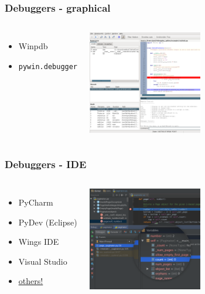 \documentclass[14pt,notes,svgnames,aspectratio=169]{beamer}
\begin{document}
\begin{frame}
    \frametitle{Debuggers - graphical}
    \begin{columns}
        \begin{itemize}
            \item Winpdb
            \item \lstinline{pywin.debugger}
        \end{itemize}

        \vspace*{0cm}
        \hspace*{0cm}\includegraphics[width=5cm]{"images/winpdb.png"}

    \end{columns}
\end{frame}

\begin{frame}
    \frametitle{Debuggers - IDE}
    \begin{columns}
        \begin{itemize}
            \item PyCharm
            \item PyDev (Eclipse)
            \item Wings IDE
            \item Visual Studio
            \item \color{blue}\href{https://wiki.python.org/moin/IntegratedDevelopmentEnvironments}{\uline{others!}}
        \end{itemize}

        \vspace*{0cm}
        \hspace*{0cm}\includegraphics[width=5cm]{"images/pycharm.png"}

    \end{columns}
\end{frame}
\end{document}
